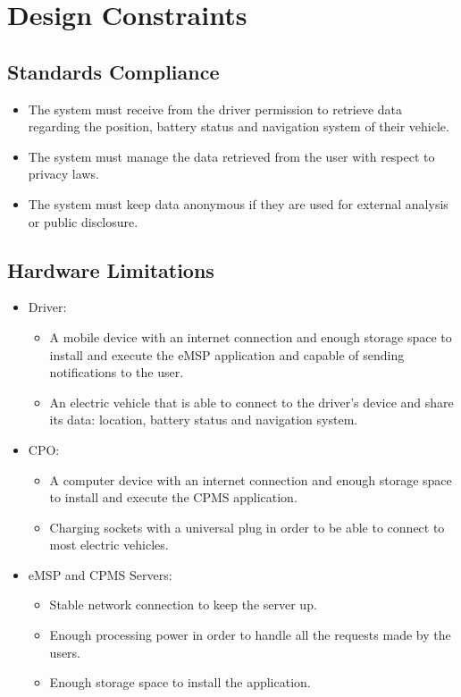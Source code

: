 \section{Design Constraints}
\label{sec:designConstraints}
\subsection{Standards Compliance}
\label{subsec:standardsCompliance}
\begin{itemize}
    \item The system must receive from the driver permission to retrieve data regarding the position, battery status and navigation system of their vehicle.
    \item The system must manage the data retrieved from the user with respect to privacy laws.
    \item The system must keep data anonymous if they are used for external analysis or public disclosure.
\end{itemize}
\subsection{Hardware Limitations}
\label{subsec:hardwareLimitations}
\begin{itemize}
    \item Driver:
    \begin{itemize}
        \item A mobile device with an internet connection and enough storage space to install and execute the eMSP application and capable of sending notifications to the user.
        \item An electric vehicle that is able to connect to the driver's device and share its data: location, battery status and navigation system.
    \end{itemize}
    \item CPO:
    \begin{itemize}
        \item A computer device with an internet connection and enough storage space to install and execute the CPMS application.
        \item Charging sockets with a universal plug in order to be able to connect to most electric vehicles.
    \end{itemize}
    \item eMSP and CPMS Servers:
    \begin{itemize}
        \item Stable network connection to keep the server up.
        \item Enough processing power in order to handle all the requests made by the users.
        \item Enough storage space to install the application.
    \end{itemize}
\end{itemize}

